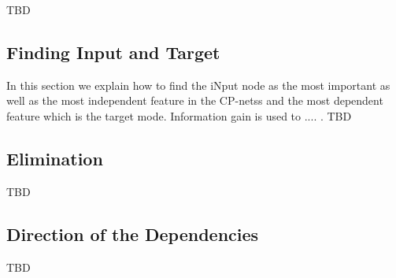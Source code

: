 \label{sec_approach}
TBD
\subsection{Finding Input and Target}
In this section we explain how to find the iNput node as the most important as well as the most independent feature in the CP-netss and the most dependent feature which is the target mode.
Information gain is used to .... .
TBD
\subsection{Elimination}
TBD
\subsection{Direction of the Dependencies}
TBD